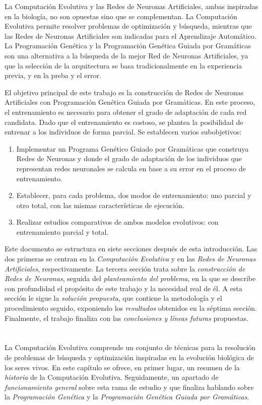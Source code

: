 \documentclass[spanish,a4paper,12pt,twoside]{report}
\begin{document}
  La Computación Evolutiva y las Redes de Neuronas Artificiales, ambas inspiradas en la biología, no son opuestas sino que se complementan. La Computación Evolutiva permite resolver problemas de optimización y búsqueda, mientras que las Redes de Neuronas Artificiales son indicadas para el Aprendizaje Automático. La Programación Genética y la Programación Genética Guiada por Gramáticas son una alternativa a la búsqueda de la mejor Red de Neuronas Artificiales, ya que la selección de la arquitectura se basa tradicionalmente en la experiencia previa, y en la preba y el error. \par
  El objetivo principal de este trabajo es la construcción de Redes de Neuronas Artificiales con Programación Genética Guiada por Gramáticas. En este proceso, el entrenamiento es necesario para obtener el grado de adaptación de cada red candidata. Dado que el entrenamiento es costoso, se plantea la posibilidad de entrenar a los individuos de forma parcial. Se establecen varios subobjetivos:
  \begin{enumerate}
    \item Implementar un Programa Genético Guiado por Gramáticas que construya Redes de Neuronas y donde el grado de adaptación de los individuos que representan redes neuronales se calcula en base a su error en el proceso de entrenamiento.
    \item Establecer, para cada problema, dos modos de entrenamiento: uno parcial y otro total, con las mismas características de ejecución.
    \item Realizar estudios comparativos de ambos modelos evolutivos: con entrenamiento parcial y total.
  \end{enumerate} \par
  Este documento se estructura en siete secciones después de esta introducción. Las dos primeras se centran en la \emph{Computación Evolutiva} y en las \emph{Redes de Neuronas Artificiales}, respectivamente. La tercera sección trata sobre la \emph{construcción de Redes de Neuronas}, seguida del \emph{planteamiento del problema}, en la que se describe con profundidad el propósito de este trabajo y la necesidad real de él. A esta sección le sigue la \emph{solución propuesta}, que contiene la metodología y el procedimiento seguido, exponiendo los \emph{resultados} obtenidos en la séptima sección. Finalmente, el trabajo finaliza con las \emph{conclusiones y líneas futuras} propuestas. \par
  
  \chapter{\vspace{-3cm}{\LARGE 2. Computación Evolutiva}}
  \vspace{-1cm}
  La Computación Evolutiva comprende un conjunto de técnicas para la resolución de problemas de búsqueda y optimización inspiradas en la evolución biológica de los seres vivos. En este capítulo se ofrece, en primer lugar, un resumen de la \emph{historia} de la Computación Evolutiva. Seguidamente, un apartado de \emph{funcionamiento general} sobre esta rama de estudio y que finaliza hablando sobre la \emph{Programación Genética} y la \emph{Programación Genética Guiada por Gramáticas}.
\end{document}
